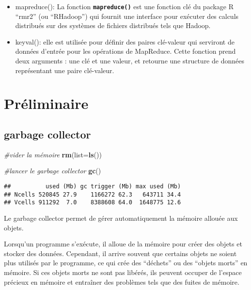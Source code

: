 \documentclass[
]{article}
\newenvironment{Shaded}{\begin{snugshade}}{\end{snugshade}}
\newcommand{\AttributeTok}[1]{\textcolor[rgb]{0.13,0.29,0.53}{#1}}
\newcommand{\CommentTok}[1]{\textcolor[rgb]{0.56,0.35,0.01}{\textit{#1}}}
\newcommand{\FunctionTok}[1]{\textcolor[rgb]{0.13,0.29,0.53}{\textbf{#1}}}
\newcommand{\NormalTok}[1]{#1}
\begin{document}
\begin{itemize}
  \begin{itemize}
  \item
    mapreduce(): La fonction \textbf{\texttt{mapreduce()}} est une
    fonction clé du package R ``rmr2'' (ou ``RHadoop'') qui fournit une
    interface pour exécuter des calculs distribués sur des systèmes de
    fichiers distribués tels que Hadoop.
  \item
    keyval(): elle est utilisée pour définir des paires clé-valeur qui
    serviront de données d'entrée pour les opérations de MapReduce.
    Cette fonction prend deux arguments : une clé et une valeur, et
    retourne une structure de données représentant une paire clé-valeur.
  \end{itemize}
\end{itemize}

\hypertarget{pruxe9liminaire}{%
\section{Préliminaire}\label{pruxe9liminaire}}
\subsection{garbage collector}
\begin{Shaded}
\begin{Highlighting}[]
\CommentTok{\#vider la mémoire}
\FunctionTok{rm}\NormalTok{(}\AttributeTok{list=}\FunctionTok{ls}\NormalTok{())}
\end{Highlighting}
\end{Shaded}

\begin{Shaded}
\begin{Highlighting}[]
\CommentTok{\#lancer le garbage collector}
\FunctionTok{gc}\NormalTok{()}
\end{Highlighting}
\end{Shaded}

\begin{verbatim}
##          used (Mb) gc trigger (Mb) max used (Mb)
## Ncells 520845 27.9    1166272 62.3   643711 34.4
## Vcells 911292  7.0    8388608 64.0  1648775 12.6
\end{verbatim}

Le garbage collector permet de gérer automatiquement la mémoire allouée
aux objets.

Lorsqu'un programme s'exécute, il alloue de la mémoire pour créer des
objets et stocker des données. Cependant, il arrive souvent que certains
objets ne soient plus utilisés par le programme, ce qui crée des
``déchets'' ou des ``objets morts'' en mémoire. Si ces objets morts ne
sont pas libérés, ils peuvent occuper de l'espace précieux en mémoire et
entraîner des problèmes tels que des fuites de mémoire.
\end{document}
